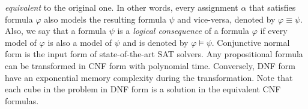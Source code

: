 \emph{equivalent} to the original one.  
In other words, every assignment $\alpha$ that satisfies formula $\varphi$  also models the resulting formula $\psi$
and vice-versa, denoted by $\varphi \equiv \psi$.
 Also, we say that a formula $\psi$ is a \emph{logical consequence} of a formula $\varphi$ if every model of $\varphi$
 is also a model of $\psi$ and is denoted by $\varphi \models \psi$.
Conjunctive normal form is the input form of state-of-the-art SAT solvers. Any propositional
formula can be transformed in CNF form with polynomial time. Conversely, DNF form have
an exponential memory complexity during the transformation.
Note that each cube in the problem in DNF form is a solution in the equivalent CNF formulas.
%
